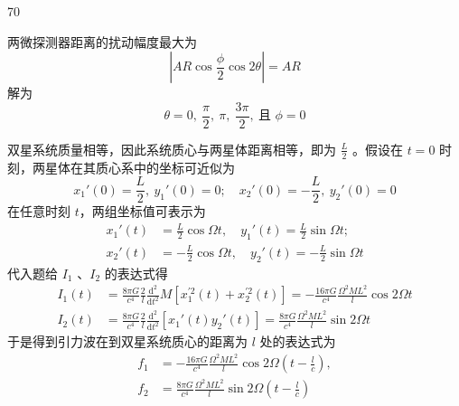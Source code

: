 \begin{solution}{70}
\begin{subsolution}
\begin{subsubsolution}
\begin{equation}
            \end{equation}
            两微探测器距离的扰动幅度最大为
            \begin{equation*}
                |A R \cos\frac{\phi}{2}\cos 2\theta| = A R
            \end{equation*}
            解为
            \begin{equation}
                \theta = 0,\ \frac{\pi}{2},\ \pi,\ \frac{3\pi}{2},\ \text{且 } \phi = 0 \label{eq:14.p70}
            \end{equation}
        \end{subsubsolution}
    \end{subsolution}
    \begin{subsolution}
        双星系统质量相等，因此系统质心与两星体距离相等，即为 $\frac{L}{2}$ 。假设在 $t=0$ 时刻，两星体在其质心系中的坐标可近似为
        \begin{equation}
            x_{1}'(0) = \frac{L}{2},\ y_{1}'(0) = 0;\quad x_{2}'(0) = -\frac{L}{2},\ y_{2}'(0) = 0 \label{eq:15.p70}
        \end{equation}
        在任意时刻 $t$，两组坐标值可表示为
        \begin{align}
            x_{1}'(t) &= \frac{L}{2}\cos\Omega t,\quad y_{1}'(t) = \frac{L}{2}\sin\Omega t; \nonumber \\
            x_{2}'(t) &= -\frac{L}{2}\cos\Omega t,\quad y_{2}'(t) = -\frac{L}{2}\sin\Omega t \label{eq:16.p70}
        \end{align}
        代入题给 $I_{1}$ 、$I_{2}$ 的表达式得
        \begin{align}
            I_{1}(t) &= \frac{8\pi G}{c^{4}} \frac{2}{l} \frac{\mathrm{d}^{2}}{\mathrm{d}t^{2}} M\left[ x_{1}^{\prime 2}(t) + x_{2}^{\prime 2}(t) \right] = -\frac{16\pi G}{c^{4}} \frac{\Omega^{2} M L^{2}}{l} \cos 2\Omega t \nonumber \\
            I_{2}(t) &= \frac{8\pi G}{c^{4}} \frac{2}{l} \frac{\mathrm{d}^{2}}{\mathrm{d}t^{2}} \left[ x_{1}'(t) y_{2}'(t) \right] = \frac{8\pi G}{c^{4}} \frac{\Omega^{2} M L^{2}}{l} \sin 2\Omega t
        \end{align}
        于是得到引力波在到双星系统质心的距离为 $l$ 处的表达式为
        \begin{align}
            f_{1} &= -\frac{16\pi G}{c^{4}} \frac{\Omega^{2} M L^{2}}{l} \cos 2\Omega(t - \frac{l}{c}), \nonumber \\
            f_{2} &= \frac{8\pi G}{c^{4}} \frac{\Omega^{2} M L^{2}}{l} \sin 2\Omega(t - \frac{l}{c}) \label{eq:17.p70}

\end{align}
\end{subsolution}
\end{solution}

